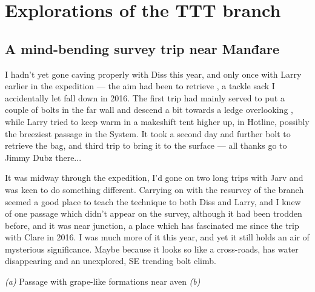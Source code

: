 \section{Explorations of the TTT branch}


\subsection{A mind-bending survey trip near Manđare}
	I hadn't yet gone caving properly with Diss this year, and only once with Larry earlier in the expedition --- the aim had been to retrieve , a tackle sack I accidentally let fall down in 2016. The first trip had mainly served to put a couple of bolts in the far wall and descend a bit towards a ledge overlooking , while Larry tried to keep warm in a makeshift tent higher up, in Hotline, possibly the breeziest passage in the System. It took a second day and further bolt to retrieve the bag, and third trip to bring it to the surface --- all thanks go to Jimmy Dubz there...
	
	It was midway through the expedition, I'd gone on two long trips with Jarv and was keen to do something different. Carrying on with the resurvey of the  branch seemed a good place to teach the technique to both Diss and Larry, and I knew of one passage which didn't appear on the survey, although it had been trodden before, and it was near  junction, a place which has fascinated me since the trip with Clare in 2016. I was much more of it this year, and yet it still holds an air of mysterious significance. Maybe because it looks so like a cross-roads, has water disappearing and an unexplored, SE trending bolt climb. 
	

	\begin{pagefigure}
	\checkoddpage \ifoddpage \forcerectofloat \else \forceversofloat \fi
	\centering
	\begin{subfigure}[t]{0.7031\textwidth}
		\centering
		 \caption{}\label{formations povezava}
	\end{subfigure}
  	 \hfill
   	 \begin{subfigure}[t]{0.2869\textwidth}
        		\centering
        		\caption{} \label{povezava passage}
        \end{subfigure}
        	\caption{
	 	  \textit{(a)} Passage with grape-like formations near \protect{} aven
   		 \textit{(b)} \protect{} }
	
\end{pagefigure}

